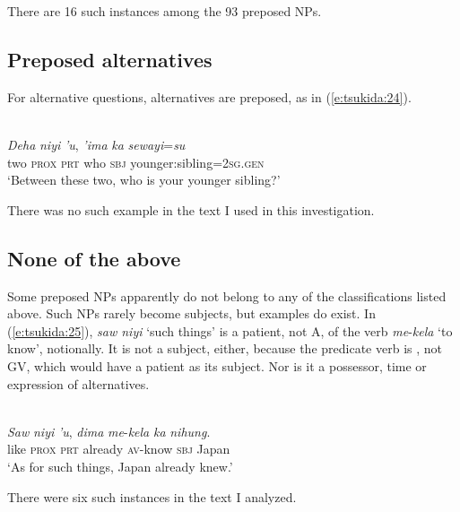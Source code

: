 \documentclass[output=paper
,modfonts
,nonflat]{langsci/langscibook}
\begin{document}
\noindent
There are 16 such instances among the 93 preposed NPs.

\subsection{\label{s:tsukida:2.5}Preposed alternatives}

For alternative questions, alternatives are preposed, as in (\ref{e:tsukida:24}).

\begin{exe}
	\label{e:tsukida:24}\\
	\gll \textit{Deha} \textit{niyi} \textit{'u}, \textit{'ima}  \textit{ka} \textit{sewayi}=\textit{su}{\USQMark}\\
	two \textsc{prox} \textsc{prt} who \textsc{sbj} younger:sibling=\textsc{2sg}.\textsc{gen}\\
	\glt ‘Between these two, who is your younger sibling?’
\end{exe}

\noindent
There was no such example in the text I used in this investigation.

\subsection{\label{s:tsukida:2.6}None of the above}

Some preposed NPs apparently do not belong to any of the classifications listed above. Such NPs rarely become subjects, but examples do exist. In (\ref{e:tsukida:25}), \textit{saw niyi} ‘such things’ is a patient, not A, of the verb \textit{me}-\textit{kela} ‘to know’, notionally. It is not a subject, either, because the predicate verb is , not GV, which would have a patient as its subject. Nor is it a possessor, time or expression of alternatives.

\begin{exe}
	\label{e:tsukida:25}\\
	\gll \textit{Saw}   \textit{niyi}  \textit{'u},  \textit{dima}  \textit{me}-\textit{kela}     \textit{ka}  \textit{nihung}.\\
	like   \textsc{prox} \textsc{prt}   already \textsc{av}-know   \textsc{sbj} Japan\\
	\glt ‘As for such things, Japan already knew.’
\end{exe}

\noindent
There were six such instances in the text I analyzed.
\end{document}
